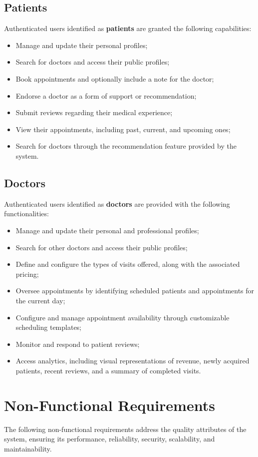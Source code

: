 \subsection{Patients}
Authenticated users identified as \textbf{patients} are granted the following capabilities:
\begin{itemize}
	\item Manage and update their personal profiles;
	\item Search for doctors and access their public profiles;
	\item Book appointments and optionally include a note for the doctor;
	\item Endorse a doctor as a form of support or recommendation;
	\item Submit reviews regarding their medical experience;
	\item View their appointments, including past, current, and upcoming ones;
	\item Search for doctors through the recommendation feature provided by the system.
\end{itemize}

\subsection{Doctors}
Authenticated users identified as \textbf{doctors} are provided with the following functionalities:
\begin{itemize}
	\item Manage and update their personal and professional profiles;
	\item Search for other doctors and access their public profiles;
	\item Define and configure the types of visits offered, along with the associated pricing;
	\item Oversee appointments by identifying scheduled patients and appointments for the current day;
	\item Configure and manage appointment availability through customizable scheduling templates;
	\item Monitor and respond to patient reviews;
	\item Access analytics, including visual representations of revenue, newly acquired patients, recent reviews, and a summary of completed visits.
\end{itemize}

\section{Non-Functional Requirements}
The following non-functional requirements address the quality attributes of the system, ensuring its performance, reliability, security, scalability, and maintainability.

